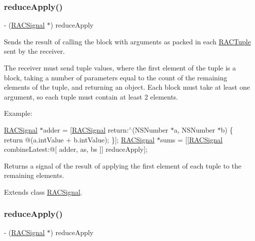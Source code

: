\subsubsection{\texorpdfstring{reduce\+Apply()}{reduceApply()}\hspace{0.1cm}{\footnotesize\ttfamily [2/3]}}
{\footnotesize\ttfamily -\/ (\mbox{\hyperlink{interface_r_a_c_signal}{R\+A\+C\+Signal}} $\ast$) reduce\+Apply \begin{DoxyParamCaption}{ }\end{DoxyParamCaption}}

Sends the result of calling the block with arguments as packed in each \mbox{\hyperlink{interface_r_a_c_tuple}{R\+A\+C\+Tuple}} sent by the receiver.

The receiver must send tuple values, where the first element of the tuple is a block, taking a number of parameters equal to the count of the remaining elements of the tuple, and returning an object. Each block must take at least one argument, so each tuple must contain at least 2 elements.

Example\+:

\mbox{\hyperlink{interface_r_a_c_signal}{R\+A\+C\+Signal}} $\ast$adder = \mbox{[}\mbox{\hyperlink{interface_r_a_c_signal}{R\+A\+C\+Signal}} return\+:$^\wedge$(N\+S\+Number $\ast$a, N\+S\+Number $\ast$b) \{ return @(a.\+int\+Value + b.\+int\+Value); \}\mbox{]}; \mbox{\hyperlink{interface_r_a_c_signal}{R\+A\+C\+Signal}} $\ast$sums = \mbox{[}\mbox{[}\mbox{\hyperlink{interface_r_a_c_signal}{R\+A\+C\+Signal}} combine\+Latest\+:@\mbox{[} adder, as, bs \mbox{]}\mbox{]} reduce\+Apply\mbox{]};

Returns a signal of the result of applying the first element of each tuple to the remaining elements. 

Extends class \mbox{\hyperlink{interface_r_a_c_signal_a60241be15dba6de172d2ab14be09b657}{R\+A\+C\+Signal}}.

\mbox{\label{category_r_a_c_signal_07_operations_08_a60241be15dba6de172d2ab14be09b657}} 
\subsubsection{\texorpdfstring{reduce\+Apply()}{reduceApply()}\hspace{0.1cm}{\footnotesize\ttfamily [3/3]}}
{\footnotesize\ttfamily -\/ (\mbox{\hyperlink{interface_r_a_c_signal}{R\+A\+C\+Signal}} $\ast$) reduce\+Apply \begin{DoxyParamCaption}{ }\end{DoxyParamCaption}}

